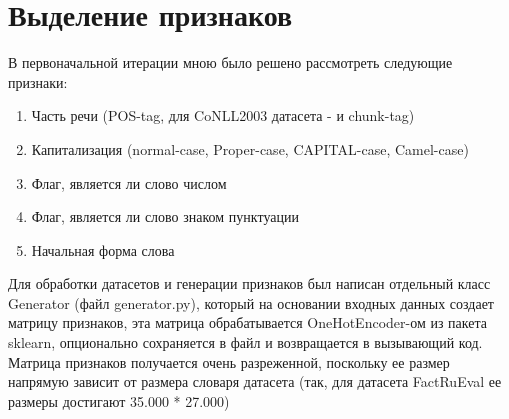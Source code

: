 \section{Выделение признаков}

В первоначальной итерации мною было решено рассмотреть следующие признаки:
\begin{enumerate}
    \item Часть речи (POS-tag, для CoNLL2003 датасета - и chunk-tag)
    \item Капитализация (normal-case, Proper-case, CAPITAL-case, Camel-case)
    \item Флаг, является ли слово числом
    \item Флаг, является ли слово знаком пунктуации
    \item Начальная форма слова
\end{enumerate}

Для обработки датасетов и генерации признаков был написан отдельный класс Generator (файл generator.py), который на основании входных данных создает матрицу признаков, эта матрица обрабатывается OneHotEncoder-ом из пакета sklearn, опционально сохраняется в файл и возвращается в вызывающий код. Матрица признаков получается очень разреженной, поскольку ее размер напрямую зависит от размера словаря датасета (так, для датасета FactRuEval ее размеры достигают 35.000 * 27.000)